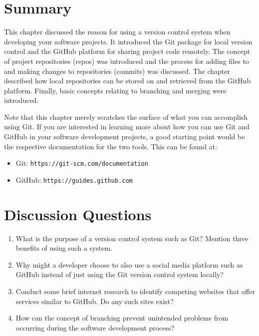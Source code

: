 \documentclass{book}
\begin{document}
\section{Summary}
This chapter discussed the reason for using a version control system when developing your software projects. It introduced the Git package for local version control and the GitHub platform for sharing project code remotely. The concept of project repositories (repos) was introduced and the process for adding files to and making changes to repositories (commits) was discussed. The chapter described how local repositories can be stored on and retrieved from the GitHub platform. Finally, basic concepts relating to branching and merging were introduced.

Note that this chapter merely scratches the surface of what you can accomplish using Git. If you are interested in learning more about how you can use Git and GitHub in your software development projects, a good starting point would be the respective documentation for the two tools. This can be found at:

\begin{itemize}
	\item Git: \texttt{https://git-scm.com/documentation}
	\item GitHub: \texttt{https://guides.github.com}
\end{itemize}

\section{Discussion Questions}

\begin{enumerate}
	\item What is the purpose of a version control system such as Git? Mention three benefits of using such a system.
	\item Why might a developer choose to also use a social media platform such as GitHub instead of just using the Git version control system locally?
	\item Conduct some brief internet research to identify competing websites that offer services similar to GitHub. Do any such sites exist?
	\item How can the concept of branching prevent unintended problems from occurring during the software development process?
\end{enumerate}
\end{document}
